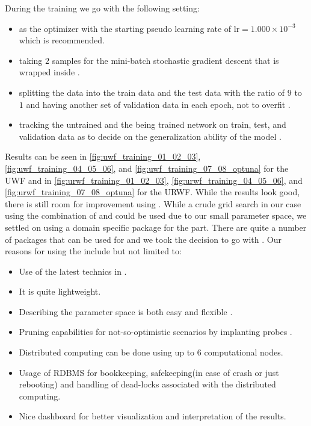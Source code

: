 During the training we go with the following setting:
\begin{itemize}
  \item \adam\cite{Kingma2014}\index{\adam} as the optimizer with the starting pseudo learning rate of $\mathrm{lr}=1.000\times10^{-3}$ which is recommended\cite{Kingma2014}\cite{Sun2019}.
  \item taking $2$ samples for the mini-batch stochastic gradient descent that is wrapped inside \adam\cite{Kingma2014}\index{\adam}.
  \item splitting the data into the train data and the test data with the ratio of $9$ to $1$ and having another set of 
  validation data in each epoch, not to overfit \cite{Chollet2023}.
  \item tracking the untrained and the being trained network on train, test, and validation data as to decide on the generalization ability of the model \cite{Chollet2023}.
\end{itemize}
Results can be seen in \cref{fig:uwf_training_01_02_03}, \ref{fig:uwf_training_04_05_06}, and \ref{fig:uwf_training_07_08_optuna} for the 
\ac{UWF} and in \cref{fig:urwf_training_01_02_03}, \ref{fig:urwf_training_04_05_06}, and \ref{fig:urwf_training_07_08_optuna} 
for the \ac{URWF}. While the results look good, there is still room for improvement using \ho\cite{Hutter2019}\cite{Akiba2019}\index{\ho}. 
While a crude grid search in our case using the combination of \bash\cite{Ramey2022}\index{\bash} and \awk\cite{Robbins2023}\index{\awk} could be used due to our small parameter space, we settled on 
using a domain specific package for the \ho\cite{Hutter2019}\cite{Akiba2019}\index{\ho} part. There are quite a number of packages that can be used for \ho\cite{Hutter2019}\cite{Akiba2019}\index{\ho} and we took the decision to go with 
\optuna\cite{Akiba2019}\index{\optuna}. Our reasons for using the \optuna\cite{Akiba2019}\index{\optuna} include but not limited to:
\begin{itemize}
  \item Use of the latest technics in \ho\cite{Hutter2019}\cite{Akiba2019}\index{\ho}.
  \item It is quite lightweight.
  \item Describing the parameter space is both easy and flexible \cite{Akiba2019}.
  \item Pruning capabilities for not-so-optimistic scenarios by implanting probes \cite{Akiba2019}.
  \item Distributed computing can be done using up to 6 computational nodes.
  \item Usage of \ac{RDBMS} for bookkeeping, safekeeping(in case of crash or just rebooting) and handling of dead-locks associated with the distributed computing.
  \item Nice dashboard for better visualization and interpretation of the results.  
\end{itemize}
